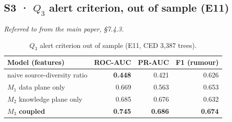 \subsection*{S3 · $Q_3$ alert criterion, out of sample (E11)}
\noindent\emph{Referred to from the main paper, \S7.4.3.}

\begin{table}[htbp]
\caption{$Q_3$ alert criterion out of sample (E11, CED 3,387 trees).}
\label{stab:alert}
\centering
\scriptsize
\renewcommand{\arraystretch}{1.14}
\begin{tabular}{@{}lrrr@{}}
\toprule
\textbf{Model (features)} & \textbf{ROC-AUC} & \textbf{PR-AUC} & \textbf{F1 (rumour)}\\
\midrule
naive source-diversity ratio & \textbf{0.448} & 0.421 & 0.626\\
$M_1$ data plane only & 0.669 & 0.563 & 0.653\\
$M_2$ knowledge plane only & 0.685 & 0.676 & 0.632\\
$M_3$ \textbf{coupled} & \textbf{0.745} & \textbf{0.686} & \textbf{0.674}\\
\bottomrule
\end{tabular}
\end{table}

